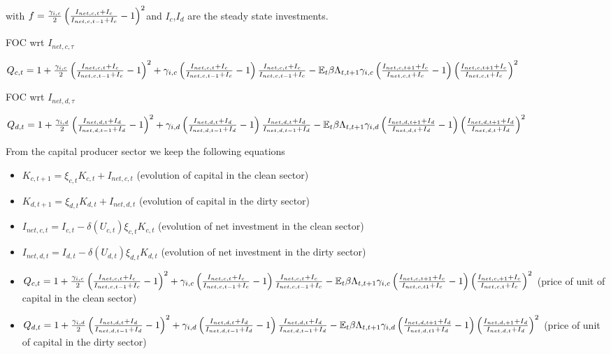 \documentclass{article}
\begin{document}
with $f=\frac{\gamma _{i,c}}{2}\left( \frac{I_{net,c,t}+I_{c}}{%
I_{net,c,t-1}+I_{c}}-1\right) ^{2}$and $I_{c}$,$I_{d}$ are the steady state
investments.

FOC wrt $I_{net,c,\tau }$

$Q_{c,t}=1+\frac{\gamma _{i,c}}{2}\left( \frac{I_{net,c,t}+I_{c}}{%
I_{net,c,t-1}+I_{c}}-1\right) ^{2}+\gamma _{i,c}\left( \frac{%
I_{net,c,t}+I_{c}}{I_{net,c,t-1}+I_{c}}-1\right) \frac{I_{net,c,t}+I_{c}}{%
I_{net,c,t-1}+I_{c}}-\mathbb{E}_{t}\beta \Lambda _{t,t+1}\gamma _{i,c}\left( 
\frac{I_{net,c,t+1}+I_{c}}{I_{net,c,t}+I_{c}}-1\right) \left( \frac{%
I_{net,c,t+1}+I_{c}}{I_{net,c,t}+I_{c}}\right) ^{2}$

FOC wrt $I_{net,d,\tau }$

$Q_{d,t}=1+\frac{\gamma _{i,d}}{2}\left( \frac{I_{net,d,t}+I_{d}}{%
I_{net,d,t-1}+I_{d}}-1\right) ^{2}+\gamma _{i,d}\left( \frac{%
I_{net,d,t}+I_{d}}{I_{net,d,t-1}+I_{d}}-1\right) \frac{I_{net,d,t}+I_{d}}{%
I_{net,d,t-1}+I_{d}}-\mathbb{E}_{t}\beta \Lambda _{t,t+1}\gamma _{i,d}\left( 
\frac{I_{net,d,t+1}+I_{d}}{I_{net,d,t}+I_{d}}-1\right) \left( \frac{%
I_{net,d,t+1}+I_{d}}{I_{net,d,t}+I_{d}}\right) ^{2}$

From the capital producer sector we keep the following equations

\begin{itemize}
\item $K_{c,t+1}=\xi _{c,t}K_{c,t}+I_{net,c,t}$ (evolution of capital in the
clean sector)

\item $K_{d,t+1}=\xi _{d,t}K_{d,t}+I_{net,d,t}$ (evolution of capital in the
dirty sector)

\item $I_{net,c,t}=I_{c,t}-\delta (U_{c,t})\xi _{c,t}K_{c,t}$ (evolution of
net investment in the clean sector)

\item $I_{net,d,t}=I_{d,t}-\delta (U_{d,t})\xi _{d,t}K_{d,t}$ (evolution of
net investment in the dirty sector)

\item $Q_{c,t}=1+\frac{\gamma _{i,c}}{2}\left( \frac{I_{net,c,t}+I_{c}}{%
I_{net,c,t-1}+I_{c}}-1\right) ^{2}+\gamma _{i,c}\left( \frac{%
I_{net,c,t}+I_{c}}{I_{net,c,t-1}+I_{c}}-1\right) \frac{I_{net,c,t}+I_{c}}{%
I_{net,c,t-1}+I_{c}}-\mathbb{E}_{t}\beta \Lambda _{t,t+1}\gamma _{i,c}\left( 
\frac{I_{net,c,t+1}+I_{c}}{I_{net,c,t1}+I_{c}}-1\right) \left( \frac{%
I_{net,c,+1}+I_{c}}{I_{net,c,t}+I_{c}}\right) ^{2}$ (price of unit of
capital in the clean sector)

\item $Q_{d,t}=1+\frac{\gamma _{i,d}}{2}\left( \frac{I_{net,d,t}+I_{d}}{%
I_{net,d,t-1}+I_{d}}-1\right) ^{2}+\gamma _{i,d}\left( \frac{%
I_{net,d,t}+I_{d}}{I_{net,d,t-1}+I_{d}}-1\right) \frac{I_{net,d,t}+I_{d}}{%
I_{net,d,t-1}+I_{d}}-\mathbb{E}_{t}\beta \Lambda _{t,t+1}\gamma _{i,d}\left( 
\frac{I_{net,d,t+1}+I_{d}}{I_{net,d,t1}+I_{d}}-1\right) \left( \frac{%
I_{net,d,+1}+I_{d}}{I_{net,d,t}+I_{d}}\right) ^{2}$ (price of unit of
capital in the dirty sector)
\end{itemize}
\end{document}
